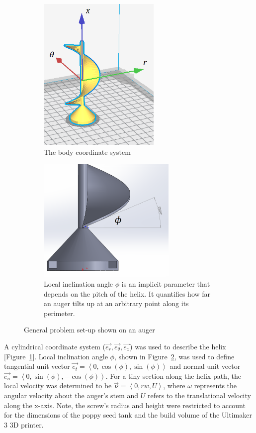 \documentclass[letterpaper, 11 pt]{article}
\begin{document}
\begin{figure}[H]
\centering
\begin{subfigure}{.5\textwidth}
	\centering
	\includegraphics[height=7.5cm]{./imgs/helix_csys}
	\caption{The body coordinate system}
	\label{fig:helix_csys}
\end{subfigure}%
\begin{subfigure}{.5\textwidth}
	\centering
	\includegraphics[height=6cm]{./imgs/helix_phi}
	\caption{Local inclination angle $\phi$ is an implicit parameter that depends on the pitch of the helix. It quantifies how far an auger tilts up at an arbitrary point along its perimeter.}
	\label{fig:helix_phi}
\end{subfigure}
\caption{General problem set-up shown on an auger}
\label{probSetup}
\end{figure}
 
A cylindrical coordinate system ($\vec{e_r}, \vec{e_\theta}, \vec{e_x}$) was used to describe the helix [Figure~\ref{fig:helix_csys}]. Local inclination angle $\phi$, shown in Figure~\ref{fig:helix_phi}, was used to define tangential unit vector $\vec{e_t} = \left\langle 0, \cos(\phi),\sin(\phi)\right\rangle $ and normal unit vector $\vec{e_n} = \left\langle 0, \sin(\phi), -\cos(\phi)\right\rangle $. For a tiny section along the helix path, the local velocity was determined to be $\vec{\nu} = \left\langle 0, rw, U\right\rangle $, where $\omega$ represents the angular velocity about the auger's stem and $U$ refers to the translational velocity along the x-axis. Note, the screw's radius and height were restricted to account for the dimensions of the poppy seed tank and the build volume of the Ultimaker 3 3D printer.  
\end{document}
